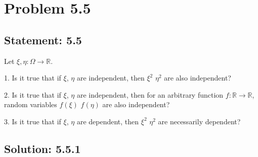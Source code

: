 \section*{Problem 5.5}

\subsection*{Statement: 5.5}
Let $\xi, \eta : \Omega \rightarrow \mathbb{R}$.

1. Is it true that if $\xi$, $\eta$ are independent, then $\xi^2$ $\eta^2$ are also independent?

2. Is it true that if $\xi$, $\eta$ are independent, then for an arbitrary function $f : \mathbb{R} \rightarrow \mathbb{R}$, random variables $f(\xi)$ $f(\eta)$ are also independent?

3. Is it true that if $\xi$, $\eta$ are dependent, then $\xi^2$ $\eta^2$ are necessarily dependent?


\subsection*{Solution: 5.5.1}
